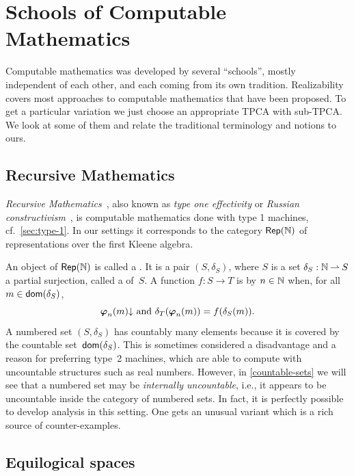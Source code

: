 \section{Schools of Computable Mathematics}
\label{sec:schools}

Computable mathematics was developed by several ``schools'', mostly
independent of each other, and each coming from its own tradition.
Realizability covers most approaches to computable mathematics that
have been proposed. To get a particular variation we just choose an
appropriate TPCA with sub-TPCA. We look at some of them and relate the
traditional terminology and notions to ours.

\subsection{Recursive Mathematics}
\label{sec:recursive-math}

\emph{Recursive Mathematics}~, also known as \emph{type
  one effectivity} or \emph{Russian constructivism}~, is
computable mathematics done with type 1 machines, cf.\
\cref{sec:type-1}. In our settings it corresponds to the
category $\mathsf{Rep}(\mathbb{N})$ of representations over the first Kleene algebra.

An object of $\mathsf{Rep}(\mathbb{N})$ is called a . It is a pair
$(S, \delta_S)$, where $S$ is a set $\delta_S : \mathbb{N} \mathbin{\rightharpoonup} S$ a
partial surjection, called a  of~$S$. A function $f :
S \to T$ is \defemph{realized} by $n \in \mathbb{N}$ when, for all $m \in
\mathsf{dom}(\delta_S)$,
%
\begin{equation*}
  \text{$\text{\boldmath{$\varphi$}}_{n}(m){\downarrow}$ and $\delta_T(\text{\boldmath{$\varphi$}}_{n}(m)) = f(\delta_S(m))$.}
\end{equation*}
%
A numbered set $(S, \delta_S)$ has countably many elements because it
is covered by the countable set~$\mathsf{dom}(\delta_S)$. This is sometimes
considered a disadvantage and a reason for preferring type~2 machines,
which are able to compute with uncountable structures such as real
numbers. However, in \cref{countable-sets} we will see that a
numbered set may be \emph{internally uncountable}, i.e., it appears to
be uncountable inside the category of numbered sets. In fact, it is
perfectly possible to develop analysis in this setting. One gets an
unusual variant which is a rich source of counter-examples.

\subsection{Equilogical spaces}
\label{sec:equilogical-spaces}

